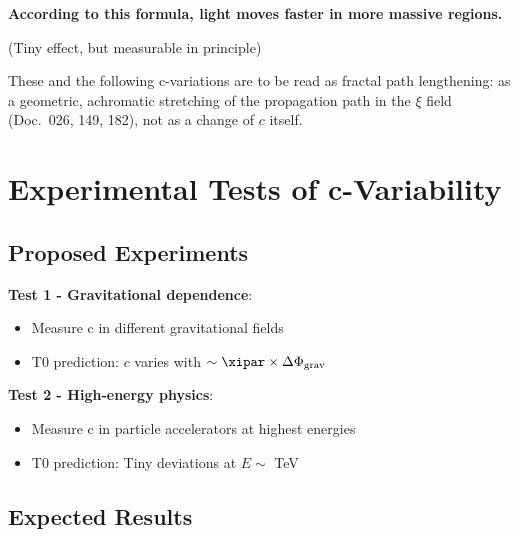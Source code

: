 	\textbf{According to this formula, light moves faster in more massive regions.}
	
	(Tiny effect, but measurable in principle)
	
	These and the following c-variations are to be read as fractal path lengthening: as a geometric, achromatic stretching of the propagation path in the $\xi$ field (Doc.~026, 149, 182), not as a change of $c$ itself.
	
	\section{Experimental Tests of c-Variability}
	
	\subsection{Proposed Experiments}
	
	\textbf{Test 1 - Gravitational dependence}:
	\begin{itemize}
		\item Measure c in different gravitational fields
		\item T0 prediction: $c$ varies with $\sim \xipar \times \Delta\Phi_{\text{grav}}$
	\end{itemize}

	\textbf{Test 2 - High-energy physics}:
	\begin{itemize}
		\item Measure c in particle accelerators at highest energies
		\item T0 prediction: Tiny deviations at $E \sim$ TeV
	\end{itemize}
	
	\subsection{Expected Results}
	
	\begin{table}[htbp]
		\centering
		\caption{Predicted c-variations}
	\end{table}
	